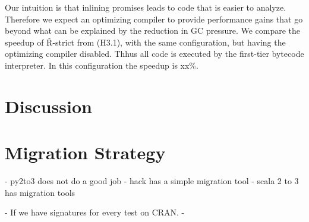\documentclass[screen,acmsmall]{acmart}
\begin{document}
Our intuition is that inlining promises leads to code that is easier to analyze.
Therefore we expect an optimizing compiler to provide performance gains that go
beyond what can be explained by the reduction in GC pressure. We compare the
speedup of Ř-strict from (H3.1), with the same configuration, but having the
optimizing compiler disabled. Thhus all code is executed by the first-tier
bytecode interpreter. In this configuration the speedup is xx\%.




\section{Discussion}



\section{Migration Strategy}
- py2to3 does not do a good job
- hack has a simple migration tool
- scala 2 to 3 has migration tools

- If we have signatures for every test on CRAN.
- 



\end{document}
